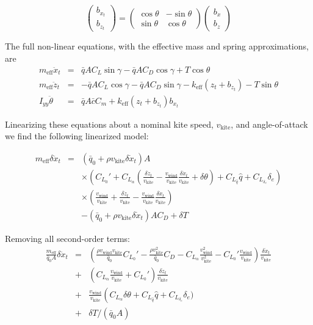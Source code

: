 \documentclass[11pt]{amsart}
\newcommand{\cbar}{\bar{c}}
\newcommand{\qbar}{\bar{q}}
\newcommand{\eff}{\mathrm{eff}}
\newcommand{\wind}{\mathrm{wind}}
\newcommand{\kite}{\mathrm{kite}}
\begin{document}
\begin{equation}
\left(
\begin{array}{c}
b_x_t \\
b_z_t
\end{array}
\right)
=
\left(
\begin{array}{cc}
\cos \theta & -\sin \theta \\
\sin \theta & \cos \theta
\end{array}
\right)
\left(
\begin{array}{c}
b_x \\
b_z
\end{array}
\right)
\end{equation}

The full non-linear equations, with the effective mass and spring
approximations, are
\begin{eqnarray}
m_{\eff} \ddot{x}_t &=& \qbar A C_L \sin \gamma -
\qbar A C_D \cos \gamma + T \cos \theta \\
m_{\eff} \ddot{z}_t &=& -\qbar A C_L \cos \gamma -
\qbar A C_D \sin \gamma - k_{\eff} (z_t + b_z_t) - T \sin \theta \\
I_{yy} \ddot{\theta} &=& \qbar A \cbar C_m + k_{\eff} (z_t + b_z_t) b_x_t
\end{eqnarray}

Linearizing these equations about a nominal kite speed, $v_{\kite}$,
and angle-of-attack we find the following linearized model:

\begin{eqnarray}
m_{\eff} \delta \ddot{x}_t &=&
\left(\qbar_0 + \rho v_{\kite} \delta \dot{x}_t \right) A \\
&&\times \left( C_{L_0}' + C_{L_{\alpha}}
\left( \frac{\delta \dot{z}_t}{v_{\kite}} -
\frac{v_{\wind}}{v_{\kite}} \frac{\delta \dot{x}_t}{v_{\kite}} +
\delta \theta \right) + C_{L_{\hat{q}}} \hat{q} + C_{L_{\delta_e}} \delta_e \right) \\
&&\times \left( \frac{v_{\wind}}{v_{\kite}} + \frac{\delta \dot{z}_t}{v_{\kite}} -
\frac{v_{\wind}}{v_{\kite}} \frac{\delta \dot{x}_t}{v_{\kite}} \right) \\
&&- \left(\qbar_0 + \rho v_{\kite} \delta \dot{x}_t \right) A C_D + \delta T
\end{eqnarray}

Removing all second-order terms:
\begin{eqnarray}
\frac{m_{\eff}}{\qbar_0 A} \delta \ddot{x}_t &=&
\left(\frac{\rho v_{\wind} v_{\kite}}{\qbar_0} C_{L_0}' -
\frac{\rho v_{\kite}^2}{\qbar_0} C_D -
C_{L_{\alpha}} \frac{v_{\wind}^2}{v_{\kite}^2} -
C_{L_0}' \frac{v_{\wind}}{v_{\kite}}\right) \frac{\delta \dot{x}_t}{v_{\kite}} \\
&+& \left(C_{L_{\alpha}} \frac{v_{\wind}}{v_{\kite}} + C_{L_0}' \right)
\frac{\delta \dot{z}_t}{v_{\kite}} \\
&+& \frac{v_{\wind}}{v_{\kite}} \left(
C_{L_{\alpha}} \delta \theta + C_{L_{\hat{q}}} \hat{q} + C_{L_{\delta_e}} \delta_e) \\
&+& \delta T /(\qbar_0 A)
\end{eqnarray}
\end{document}
